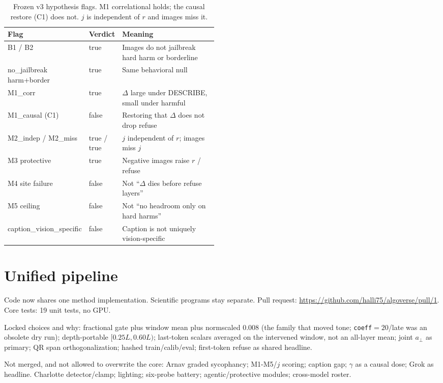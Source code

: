 \documentclass{article}
\begin{document}
\begin{table}[t]
\caption{Frozen v3 hypothesis flags. M1 correlational holds; the causal restore (C1) does not. $j$ is independent of $r$ and images miss it.}
\label{tab:hyp}
\centering
\footnotesize
\begin{tabular}{@{}llp{0.48\linewidth}@{}}
\toprule
Flag & Verdict & Meaning \\
\midrule
B1 / B2 & true & Images do not jailbreak hard harm or borderline \\
no\_jailbreak harm+border & true & Same behavioral null \\
M1\_corr & true & $\Delta$ large under DESCRIBE, small under harmful \\
M1\_causal (C1) & false & Restoring that $\Delta$ does not drop refuse \\
M2\_indep / M2\_miss & true / true & $j$ independent of $r$; images miss $j$ \\
M3 protective & true & Negative images raise $r$ / refuse \\
M4 site failure & false & Not ``$\Delta$ dies before refuse layers'' \\
M5 ceiling & false & Not ``no headroom only on hard harms'' \\
caption\_vision\_specific & false & Caption is not uniquely vision-specific \\
\bottomrule
\end{tabular}
\end{table}

\section{Unified pipeline}
\label{sec:unify}

Code now shares one method implementation. Scientific programs stay separate. Pull request: \url{https://github.com/halli75/algoverse/pull/1}. Core tests: 19 unit tests, no GPU.

Locked choices and why: fractional gate plus window mean plus normscaled $0.008$ (the family that moved tone; \texttt{coeff}$=20$/late was an obsolete dry run); depth-portable $[0.25L,0.60L)$; last-token scalars averaged on the intervened window, not an all-layer mean; joint $a_\perp$ as primary; QR span orthogonalization; hashed train/calib/eval; first-token refuse as shared headline.

Not merged, and not allowed to overwrite the core: Arnav graded sycophancy; M1-M5/$j$ scoring; caption gap; $\gamma$ as a causal dose; Grok as headline. Charlotte detector/clamp; lighting; six-probe battery; agentic/protective modules; cross-model roster.
\end{document}
